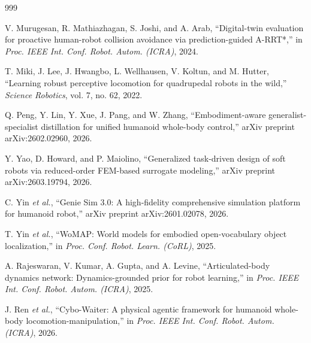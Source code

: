 \documentclass[11pt,a4paper]{article}
\begin{document}
\begin{thebibliography}{999}

V. Murugesan, R. Mathiazhagan, S. Joshi, and A. Arab, ``Digital-twin evaluation for proactive human-robot collision avoidance via prediction-guided A-RRT*,'' in \textit{Proc. IEEE Int. Conf. Robot. Autom. (ICRA)}, 2024.




T. Miki, J. Lee, J. Hwangbo, L. Wellhausen, V. Koltun, and M. Hutter, ``Learning robust perceptive locomotion for quadrupedal robots in the wild,'' \textit{Science Robotics}, vol. 7, no. 62, 2022.








Q. Peng, Y. Lin, Y. Xue, J. Pang, and W. Zhang, ``Embodiment-aware generalist-specialist distillation for unified humanoid whole-body control,'' arXiv preprint arXiv:2602.02960, 2026.








Y. Yao, D. Howard, and P. Maiolino, ``Generalized task-driven design of soft robots via reduced-order FEM-based surrogate modeling,'' arXiv preprint arXiv:2603.19794, 2026.




C. Yin \textit{et al.}, ``{Genie Sim 3.0}: A high-fidelity comprehensive simulation platform for humanoid robot,'' arXiv preprint arXiv:2601.02078, 2026.




T. Yin \textit{et al.}, ``{WoMAP}: World models for embodied open-vocabulary object localization,'' in \textit{Proc. Conf. Robot. Learn. (CoRL)}, 2025.




A. Rajeswaran, V. Kumar, A. Gupta, and A. Levine, ``Articulated-body dynamics network: Dynamics-grounded prior for robot learning,'' in \textit{Proc. IEEE Int. Conf. Robot. Autom. (ICRA)}, 2025.




J. Ren \textit{et al.}, ``Cybo-Waiter: A physical agentic framework for humanoid whole-body locomotion-manipulation,'' in \textit{Proc. IEEE Int. Conf. Robot. Autom. (ICRA)}, 2026.




\end{thebibliography}
\end{document}
